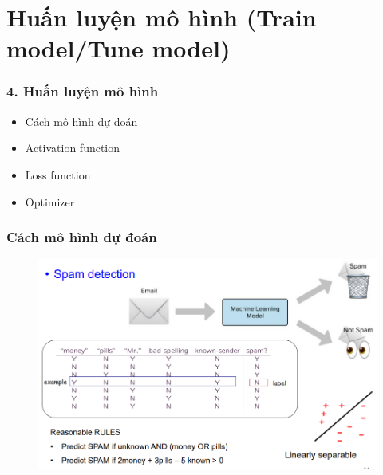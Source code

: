 \documentclass{beamer}
\begin{document}
\section{Huấn luyện mô hình (Train model/Tune model)}

\begin{frame}
\frametitle{4. Huấn luyện mô hình}
\begin{itemize}
\item Cách mô hình dự đoán
\item Activation function
\item Loss function
\item Optimizer

\end{itemize}
\end{frame}

\begin{frame}
\frametitle{Cách mô hình dự đoán}
\begin{figure}
    \centering
    \includegraphics[width=1\linewidth]{predict.png}
    
    
\end{figure}


\end{frame}
\end{document}
